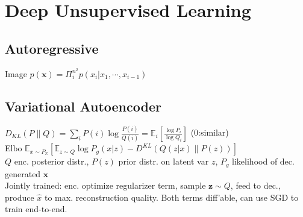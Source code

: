 \section{Deep Unsupervised Learning}
\subsection*{Autoregressive}
Image $p(\mathbf{x})=\Pi_i^{n^2}p(x_i|x_1,\cdots,x_{i-1})$ \\

\subsection*{Variational Autoencoder}
$D_{KL}(P\|Q)=\sum_i P(i)\log\frac{P(i)}{Q(i)}=\mathbb{E}_i [\frac{\log P_i}{\log Q_i}]$ (0:similar) \\
Elbo $\mathbb{E}_{x\sim P_{\mathbb{X}}}[\mathbb{E}_{z\sim Q}{\log P_g(x|z)}-D^{\mathit{KL}}(Q(z|x)\|P(z))]$ \\
$Q$ enc. posterior distr., $P(z)$ prior distr. on latent var $z$, $P_g$ likelihood of dec. generated $\mathbf{x}$ \\
Jointly trained: enc. optimize regularizer term, sample $\mathbf{z}\sim Q$, feed to dec., produce $\hat{x}$ to max. reconstruction quality. Both terms diff'able, can use SGD to train end-to-end.